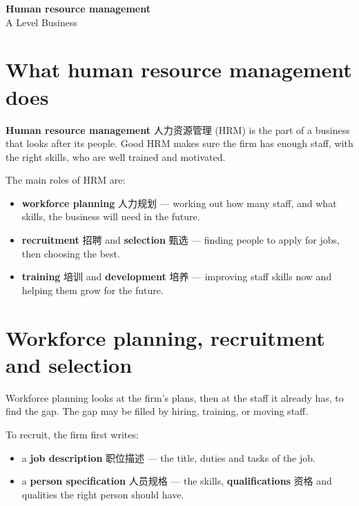 \documentclass[11pt]{article}
\begin{document}
\begin{center}
  {\LARGE\bfseries Human resource management}\\[0.35em]
  {\large A Level Business}
\end{center}
\vspace{0.6em}

\section*{What human resource management does}

\textbf{Human resource management} 人力资源管理 (HRM) is the part of a business that looks after its people. Good HRM makes sure the firm has enough staff, with the right skills, who are well trained and motivated.

The main roles of HRM are:

\begin{itemize}
\item \textbf{workforce planning} 人力规划 — working out how many staff, and what skills, the business will need in the future.

\item \textbf{recruitment} 招聘 and \textbf{selection} 甄选 — finding people to apply for jobs, then choosing the best.

\item \textbf{training} 培训 and \textbf{development} 培养 — improving staff skills now and helping them grow for the future.

\end{itemize}

\section*{Workforce planning, recruitment and selection}

Workforce planning looks at the firm's plans, then at the staff it already has, to find the gap. The gap may be filled by hiring, training, or moving staff.

To recruit, the firm first writes:

\begin{itemize}
\item a \textbf{job description} 职位描述 — the title, duties and tasks of the job.

\item a \textbf{person specification} 人员规格 — the skills, \textbf{qualifications} 资格 and qualities the right person should have.

\end{itemize}
\end{document}
